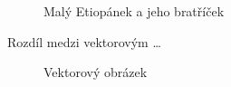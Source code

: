 \documentclass[11pt,a4paper]{article}
\begin{document}
\begin{figure}[h]
\begin{center}
    \end{center}
    \caption{Malý Etiopánek a jeho bratříček}
    \label{obr1}
\end{figure}

\clearpage
Rozdíl medzi vektorovým \ldots
\begin{figure}[h]
    \begin{center}
    \end{center}
    \caption{Vektorový obrázek}
    \label{obr2}
\end{figure}
\end{document}
